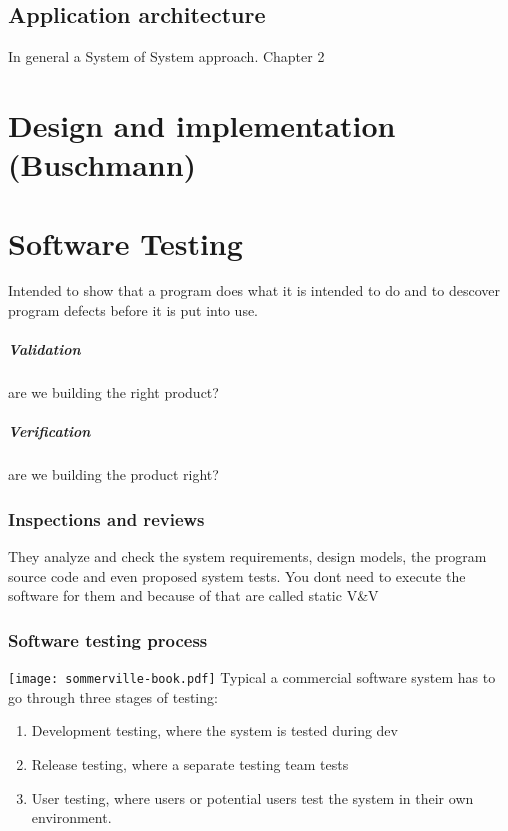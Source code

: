 \documentclass[a4paper,11pt,twocolumn]{report}
\begin{document}
    \section{Application architecture}
    In general a System of System approach. Chapter 2
    
    \chapter{Design and implementation (Buschmann)}
    
    \chapter{Software Testing}
    Intended to show that a program does what it is intended to do and to
    descover program defects before it is put into use.
    \paragraph{Validation} are we building the right product?
    \paragraph{Verification} are we building the product right?
    \subsection{Inspections and reviews}
    They analyze and check the system requirements, design models, the program
    source code and even proposed system tests. You dont need to execute the
    software for them and because of that are called static V\&V
    \subsection{Software testing process}
    \texttt{[image: sommerville-book.pdf]}
    Typical a commercial software system has to go through three stages of
    testing:
    \begin{enumerate}
        \item Development testing, where the system is tested during dev
        \item Release testing, where a separate testing team tests
        \item User testing, where users or potential users test the system in
            their own environment.
    \end{enumerate}
\end{document}
